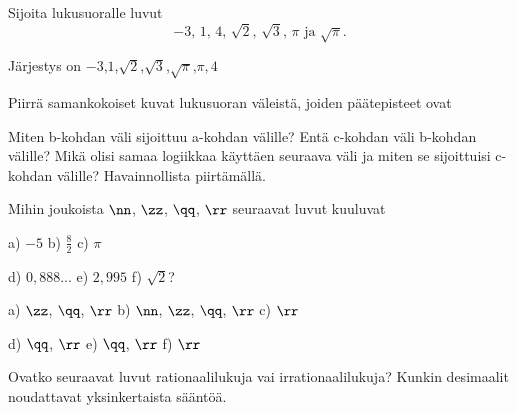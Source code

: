\begin{tehtavasivu}

\begin{tehtava}%
Sijoita lukusuoralle luvut
\[
\mbox{$-3$, $1$, $4$, $\sqrt{2}$, $\sqrt{3}$, $\pi$ ja $\sqrt{\pi}$.}
\]
\begin{vastaus}
Järjestys on \mbox{$-3$,$1$,$\sqrt{2}$,$\sqrt{3}$,$\sqrt{\pi}$,$\pi,4$}
\end{vastaus}
\end{tehtava}

\begin{tehtava} %
Piirrä samankokoiset kuvat lukusuoran väleistä, joiden päätepisteet ovat 
\begin{alakohdat}
\end{alakohdat}
Miten b-kohdan väli sijoittuu a-kohdan välille? Entä c-kohdan väli b-kohdan välille? Mikä olisi samaa logiikkaa käyttäen seuraava väli ja miten se sijoittuisi c-kohdan välille? Havainnollista piirtämällä.
\end{tehtava}


\begin{tehtava}
Mihin joukoista $\nn$, $\zz$, $\qq$, $\rr$ seuraavat luvut kuuluvat

a) $-5$ \qquad b) $\frac82$ \qquad c) $\pi$

d) $0,888...$ \qquad e) $2,995$ \qquad f) $\sqrt{2}$?

\begin{vastaus}
a) $\zz$, $\qq$, $\rr$ \qquad b) $\nn$, $\zz$, $\qq$, $\rr$ \qquad c) $\rr$

d) $\qq$, $\rr$ \qquad e) $\qq$, $\rr$ \qquad f) $\rr$
\end{vastaus}
\end{tehtava}

\begin{tehtava}
Ovatko seuraavat luvut rationaalilukuja vai irrationaalilukuja? Kunkin desimaalit
noudattavat yksinkertaista sääntöä.
\begin{alakohdat}
\end{alakohdat}
\begin{vastaus}
\begin{alakohdat}
\end{alakohdat}
\end{vastaus}
\end{tehtava}


\end{tehtavasivu}

